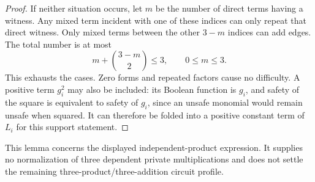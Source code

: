\documentclass[11pt]{article}
\theoremstyle{definition}
\theoremstyle{remark}
\begin{document}
\begin{proof}
If neither situation occurs, let $m$ be the number of direct terms having a witness. Any mixed term incident with one of these indices can only repeat that direct witness. Only mixed terms between the other $3-m$ indices can add edges. The total number is at most
\[
 m+\binom{3-m}{2}\le3,\qquad 0\le m\le3.
\]
This exhausts the cases. Zero forms and repeated factors cause no difficulty. A positive term $g_i^2$ may also be included: its Boolean function is $g_i$, and safety of the square is equivalent to safety of $g_i$, since an unsafe monomial would remain unsafe when squared. It can therefore be folded into a positive constant term of $L_i$ for this support statement.
\end{proof}

This lemma concerns the displayed independent-product expression. It supplies no normalization of three dependent private multiplications and does not settle the remaining three-product/three-addition circuit profile.
\end{document}
